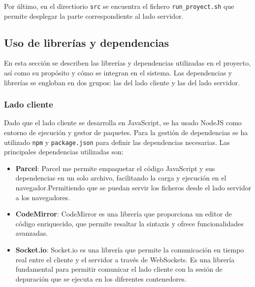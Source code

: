 Por último, en el directiorio \texttt{src} se encuentra el fichero \texttt{run\_proyect.sh} que permite desplegar la parte correspondiente al lado servidor. 

\subsection{Uso de librerías y dependencias} \label{subsec:uso_librerias_dependencias}

En esta sección se describen las librerías y dependencias utilizadas en el proyecto, así como su propósito y cómo se integran en el sistema. Las dependencias y librerías se engloban en dos grupos: las del lado cliente y las del lado servidor.

\subsubsection{Lado cliente}
Dado que el lado cliente se desarrolla en JavaScript, se ha usado NodeJS como entorno de ejecución y gestor de paquetes. Para la gestión de dependencias se ha utilizado \texttt{npm} y \texttt{package.json} para definir las dependencias necesarias.
Las principales dependencias utilizadas son:
\begin{itemize}
    \item \textbf{Parcel}: Parcel me permite empaquetar el código JavaScript y sus dependencias en un solo archivo, facilitando la carga y ejecución en el navegador.Permitiendo que se puedan servir los ficheros desde el lado servidor a los navegadores.
    \item \textbf{CodeMirror}: CodeMirror es una librería que proporciona un editor de código enriquecido, que permite resaltar la sintaxis y ofrece funcionalidades avanzadas.
    \item \textbf{Socket.io}: Socket.io es una librería que permite la comunicación en tiempo real entre el cliente y el servidor a través de WebSockets. Es una librería fundamental para permitir comunicar el lado cliente con la sesión de depuración que se ejecuta en los diferentes contenedores. 
\end{itemize}

